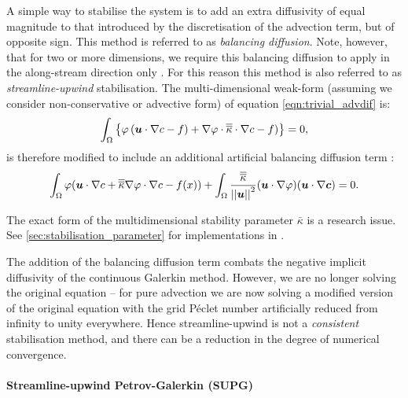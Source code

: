 A simple way to stabilise the system is to add an extra diffusivity of
equal magnitude to that introduced by the discretisation of the advection term,
but of opposite sign. This method is referred to as \textit{balancing diffusion}.
Note, however, that for two or more dimensions, we require this balancing
diffusion to apply in the along-stream direction only \citep{brooks1982, DoneaBook}.
For this reason this method is also referred to as \textit{streamline-upwind}
stabilisation. The multi-dimensional weak-form (assuming we consider non-conservative or advective form)
of equation \eqref{eqn:trivial_advdif} is:
\begin{equation}\label{eqn:trivial_advdif_weak_md}
  \int_\Omega \left\{ \varphi \left({\mbox{\boldmath$u$}} \cdot \nabla c -f \right)+ \nabla \varphi \cdot \overline{\overline{\kappa}}  \cdot \nabla c -f)\right\} = 0,
\end{equation}
is therefore modified to include an additional artificial balancing diffusion
term \citep{DoneaBook}:
\begin{equation}\label{eqn:balancing_diffusion}
  \int_\Omega \varphi ({\mbox{\boldmath$u$}} \cdot \nabla c + \overline{\overline{\kappa}} \nabla \varphi \cdot \nabla c - f(x)) +
  \int_\Omega \frac{\overline{\overline{\kappa}}}{\left|\left| {\mbox{\boldmath$u$}} \right|\right|^2}
  ({\mbox{\boldmath$u$}} \cdot \nabla \varphi) ({\mbox{\boldmath$u$}} \cdot \nabla {\mbox{\boldmath$c$}})
  = 0.
\end{equation}

The exact form of the multidimensional stability parameter $\bar{\kappa}$
is a research issue. See \ref{sec:stabilisation_parameter} for implementations in
\fluidity.

The addition of the balancing diffusion term combats the negative implicit
diffusivity of the continuous Galerkin method. However, we are no longer solving
the original equation -- for pure advection we are now solving a modified
version of the original equation with the grid
P\'eclet number artificially reduced from
infinity to unity everywhere. Hence streamline-upwind is not a \textit{consistent}
stabilisation method, and there can be a reduction in the degree of numerical
convergence.

\paragraph{Streamline-upwind Petrov-Galerkin (SUPG)}\label{sec:supg}

